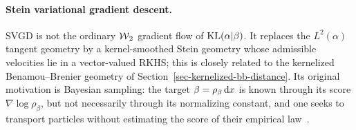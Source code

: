 \paragraph{Stein variational gradient descent.}\label{sec-svgd-generative-flow}
SVGD is not the ordinary $\operatorname{\mathcal{W}}_2$ gradient flow of $\operatorname{KL}(\alpha|\beta)$. It replaces the $L^2(\alpha)$ tangent geometry by a kernel-smoothed Stein geometry whose admissible velocities lie in a vector-valued RKHS; this is closely related to the kernelized Benamou--Brenier geometry of Section~\ref{sec-kernelized-bb-distance}. Its original motivation is Bayesian sampling: the target $\beta=\rho_\beta\,\mathrm{d} x$ is known through its score $\nabla\log\rho_\beta$, but not necessarily through its normalizing constant, and one seeks to transport particles without estimating the score of their empirical law~\cite{LiuWang2016SVGD}.

